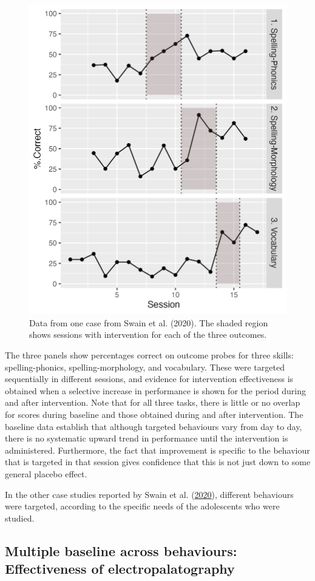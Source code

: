 \documentclass{krantz}
\begin{document}
\begin{figure}
\includegraphics[width=0.6\linewidth]{images_bw/swainplot} \caption{Data from one case from  Swain et al. (2020). The shaded region shows sessions with intervention for each of the three outcomes.}\label{fig:swainfig}
\end{figure}

The three panels show percentages correct on outcome probes for three skills: spelling-phonics, spelling-morphology, and vocabulary. These were targeted sequentially in different sessions, and evidence for intervention effectiveness is obtained when a selective increase in performance is shown for the period during and after intervention. Note that for all three tasks, there is little or no overlap for scores during baseline and those obtained during and after intervention. The baseline data establish that although targeted behaviours vary from day to day, there is no systematic upward trend in performance until the intervention is administered. Furthermore, the fact that improvement is specific to the behaviour that is targeted in that session gives confidence that this is not just down to some general placebo effect.

In the other case studies reported by Swain et al. (\protect\hyperlink{ref-swain2020}{2020}), different behaviours were targeted, according to the specific needs of the adolescents who were studied.

\hypertarget{multiple-baseline-across-behaviours-effectiveness-of-electropalatography}{%
\subsection{Multiple baseline across behaviours: Effectiveness of electropalatography}\label{Multiple-baseline-across-behaviours-effectiveness-of-electropalatography}}
\end{document}
